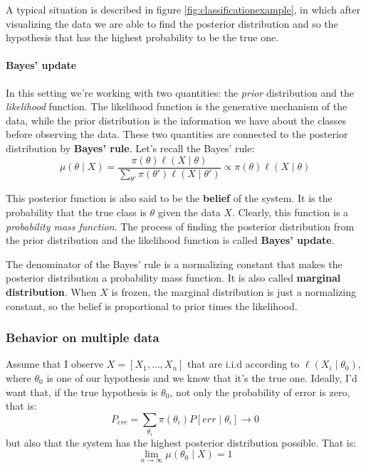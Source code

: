 
A typical situation is described in figure \ref{fig:classificationexample}, in which after visualizing the data we are able to find the posterior distribution and so the hypothesis that has the highest probability to be the true one.

\paragraph*{Bayes' update} 
In this setting we're working with two quantities: the \textit{prior} distribution and the \textit{likelihood} function. The likelihood function is the generative mechanism of the data, while the prior distribution is the information we have about the classes before observing the data. These two quantities are connected to the posterior distribution by \textbf{Bayes' rule}.
Let's recall the Bayes' rule:
\[
    \mu(\theta \mid X) = \frac{\pi(\theta) \ell(X \mid \theta)}{\sum_{\theta'} \pi(\theta') \ell(X \mid \theta')} \propto \pi(\theta) \ell(X \mid \theta)
\]

This posterior function is also said to be the \textbf{belief} of the system. It is the probability that the true class is $\theta$ given the data $X$. Clearly, this function is a \textit{probability mass function}.
The process of finding the posterior distribution from the prior distribution and the likelihood function is called \textbf{Bayes' update}.

The denominator of the Bayes' rule is a normalizing constant that makes the posterior distribution a probability mass function. It is also called \textbf{marginal distribution}.
When $X$ is frozen, the marginal distribution is just a normalizing constant, so the belief is proportional to prior times the likelihood.

\subsubsection*{Behavior on multiple data}
Assume that I observe $X = \left[X_1, \dots, X_n\right]$ that are i.i.d according to $\ell(X_i \mid \theta_0)$, where $\theta_0$ is one of our hypothesis and we know that it's the true one.
Ideally, I'd want that, if the true hypothesis is $\theta_0$, not only the probability of error is zero, that is:
\[
    P_{err} = \sum_{\theta_i}\pi(\theta_i)P[err\mid \theta_i] \to 0
\]
but also that the system has the highest posterior distribution possible. That is:
\[
    \lim_{n \to \infty} \mu(\theta_0 \mid X) = 1
\]

